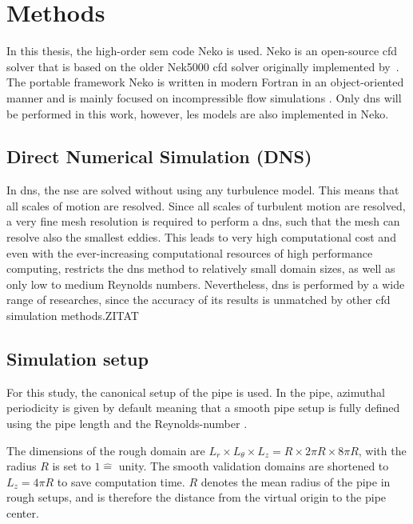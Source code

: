 \chapter{Methods}\label{chap: Methods}

In this thesis, the high-order \acrfull{sem} code Neko is used.
Neko is an open-source \acrfull{cfd} solver that is based on the older Nek5000 \acrshort{cfd} solver originally implemented by~\cite{fischerNek500WebPage}.
The portable framework Neko is written in modern Fortran in an object-oriented manner and is mainly focused on incompressible flow simulations \citep{janssonNekoModernPortable2024}.
Only \acrfull{dns} will be performed in this work, however, \acrfull{les} models are also implemented in Neko.

\section{Direct Numerical Simulation (DNS)}
In \acrshort{dns}, the \acrlong{nse} are solved without using any turbulence model.
This means that all scales of motion are resolved.
Since all scales of turbulent motion are resolved, a very fine mesh resolution is required to perform a \acrshort{dns}, such that the mesh can resolve also the smallest eddies.
This leads to very high computational cost and even with the ever-increasing computational resources of high performance computing, restricts the \acrshort{dns} method to relatively small domain sizes, as well as only low to medium Reynolds numbers.
Nevertheless, \acrshort{dns} is performed by a wide range of researches, since the accuracy of its results is unmatched by other \acrshort{cfd} simulation methods.ZITAT\\

\section{Simulation setup}\label{sec: Simulation setup}
For this study, the canonical setup of the pipe is used.
In the pipe, azimuthal periodicity is given by default meaning that a smooth pipe setup is fully defined using the pipe length and the Reynolds-number \citep{yaoDirectNumericalSimulations2023}.


The dimensions of the rough domain are $L_r \times L_\theta \times L_z = R \times 2\pi R \times 8\pi R$, with the radius $R$ is set to $1 \hat{=}$ unity. The smooth validation domains are shortened to $L_z = 4\pi R$ to save  computation time.
$R$ denotes the mean radius of the pipe in rough setups, and is therefore the distance from the virtual origin to the pipe center.


